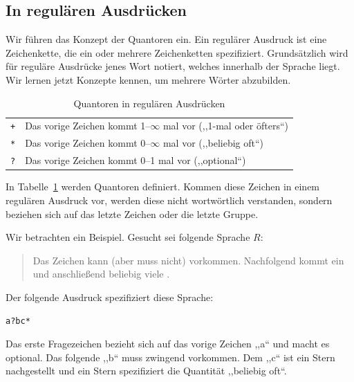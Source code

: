 \subsection{In regulären Ausdrücken}
%
Wir führen das Konzept der Quantoren ein. Ein regulärer Ausdruck ist eine Zeichenkette, die ein oder mehrere Zeichenketten spezifiziert. Grundsätzlich wird für reguläre Ausdrücke jenes Wort notiert, welches innerhalb der Sprache liegt. Wir lernen jetzt Konzepte kennen, um mehrere Wörter abzubilden.
%
\begin{table}[ht]
 \begin{center}
  \begin{tabular}{cl}
   \hline
    \texttt{+} & Das vorige Zeichen kommt 1--$\infty$ mal vor (,,1-mal oder öfters``) \\
    \texttt{*} & Das vorige Zeichen kommt 0--$\infty$ mal vor (,,beliebig oft``) \\
    \texttt{?} & Das vorige Zeichen kommt 0--1 mal vor (,,optional``) \\
   \hline
  \end{tabular}
  \caption{Quantoren in regulären Ausdrücken}
  \label{tab:quantifiers}
 \end{center}
\end{table}

In Tabelle~\ref{tab:quantifiers} werden Quantoren definiert. Kommen diese Zeichen in einem regulären Ausdruck vor, werden diese nicht wortwörtlich verstanden, sondern beziehen sich auf das letzte Zeichen oder die letzte Gruppe.

Wir betrachten ein Beispiel. Gesucht sei folgende Sprache $R$:
\begin{quote}
  Das Zeichen  kann (aber muss nicht) vorkommen. Nachfolgend kommt ein  und
  anschließend beliebig viele .
\end{quote}

Der folgende Ausdruck spezifiziert diese Sprache:
\begin{lstlisting}
a?bc*
\end{lstlisting}

Das erste Fragezeichen bezieht sich auf das vorige Zeichen ,,a`` und macht es optional. Das folgende ,,b`` muss zwingend vorkommen. Dem ,,c`` ist ein Stern nachgestellt und ein Stern spezifiziert die Quantität ,,beliebig oft``.

